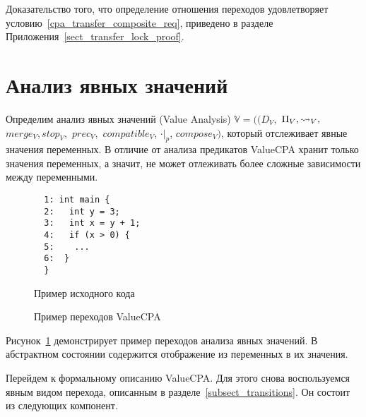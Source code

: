 Доказательство того, что определение отношения переходов удовлетворяет условию~\ref{cpa_transfer_composite_req}, приведено в разделе Приложения~\ref{sect_transfer_lock_proof}. 


\section{Анализ явных значений}
\label{sect_value_analysis}

Определим анализ явных значений (Value Analysis) $\mathbb{V}=((D_{V},$ $\Pi_{V}, \leadsto_{V},$ $merge_{V}, stop_{V},$ $prec_{V},$ $compatible_{V}$, $\cdot|_p$, $compose_V)$, который отслеживает явные значения переменных.
В отличие от анализа предикатов ValueCPA хранит только значения переменных, а значит, не может отлеживать более сложные зависимости между переменными. 

\begin{figure}[h]
\begin{minipage}[h]{0.3\textwidth}
\begin{verbatim}
  1: int main {
  2:   int y = 3;
  3:   int x = y + 1;
  4:   if (x > 0) {
  5:    ...
  6:  }
  }
\end{verbatim}
\caption{Пример исходного кода}
\label{ValueCodeExample}
\end{minipage}
\hfill
\begin{minipage}{0.65\textwidth}
    \caption{Пример переходов ValueCPA}
    \label{img:ValueCPA}
\end{minipage}
\end{figure}

Рисунок~\ref{img:ValueCPA} демонстрирует пример переходов анализа явных значений.
В абстрактном состоянии содержится отображение из переменных в их значения. 

Перейдем к формальному описанию ValueCPA.
Для этого снова воспользуемся явным видом перехода, описанным в разделе~\ref{subsect_transitions}.
Он состоит из следующих компонент.

